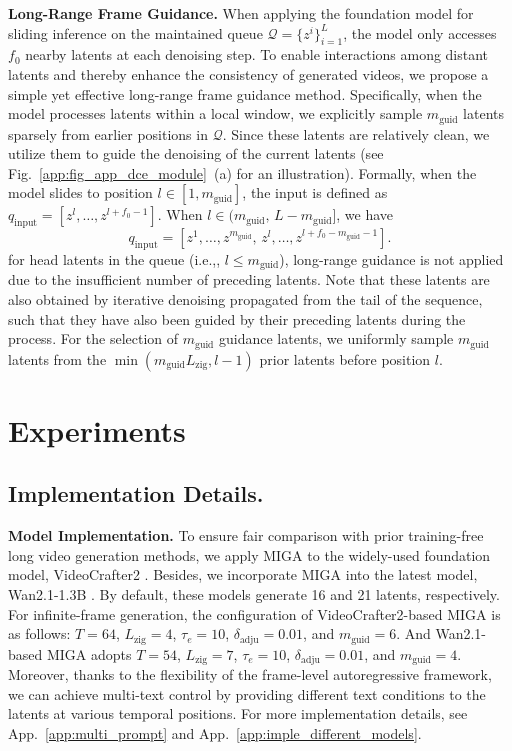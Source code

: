 \documentclass{llmxive}
\providecommand{\ie}{i.e.,\xspace}
\begin{document}
\textbf{Long-Range Frame Guidance.}
When applying the foundation model for sliding inference on the maintained queue $\mathcal{Q} = \{z^{i}\}_{i=1}^{L}$, the model only accesses $f_0$ nearby latents at each denoising step.
To enable interactions among distant latents \cite{feng2024memvlt} and thereby enhance the consistency of generated videos, we propose a simple yet effective long-range frame guidance method. 
Specifically, when the model processes latents within a local window, we explicitly sample $m_\mathrm{guid}$ latents sparsely from earlier positions in $\mathcal{Q}$.
Since these latents are relatively clean, we utilize them to guide the denoising of the current latents (see Fig.~\ref{app:fig_app_dce_module}~(a) for an illustration).
Formally, when the model slides to position $l \in [1, m_{\mathrm{guid}}]$, 
the input is defined as
$q_{\mathrm{input}} = [z^{l}, \ldots, z^{l+f_0-1}]$.
When $l \in (m_{\mathrm{guid}},\, L - m_{\mathrm{guid}}]$, we have
\begin{equation}
q_{\mathrm{input}} = [z^{1}, \ldots, z^{m_{\mathrm{guid}}},\, z^{l}, \ldots, z^{l+f_0-m_{\mathrm{guid}}-1}].
\end{equation}
for head latents in the queue (\ie, $l \leq m_\mathrm{guid}$), long-range guidance is not applied due to the insufficient number of preceding latents.
Note that these latents are also obtained by iterative denoising propagated from the tail of the sequence, such that they have also been guided by their preceding latents during the process. 
For the selection of $m_\mathrm{guid}$ guidance latents, we uniformly sample $m_\mathrm{guid}$ latents from the $\min(m_\mathrm{guid}L_{\mathrm{zig}}, l-1)$ prior latents before position $l$. 




\section{Experiments}
\subsection{Implementation Details.}
\label{exp:imp}


\textbf{Model Implementation.}
To ensure fair comparison with prior training-free long video generation methods, we apply MIGA to the widely-used foundation model, VideoCrafter2 \cite{chen2024videocrafter2}. Besides, we incorporate MIGA into the latest model, Wan2.1-1.3B \cite{wan2025wan}.
By default, these models generate 16 and 21 latents, respectively.
For infinite-frame generation, the configuration of VideoCrafter2-based MIGA is as follows: $T=64$, $L_{\mathrm{zig}}=4$, $\tau_{e}=10$, $\delta_{\mathrm{adju}}=0.01$, and $m_{\mathrm{guid}}=6$. And Wan2.1-based MIGA adopts $T=54$, $L_{\mathrm{zig}}=7$, $\tau_e=10$, $\delta_{\mathrm{adju}}=0.01$, and $m_{\mathrm{guid}}=4$. 
Moreover, thanks to the flexibility of the frame-level autoregressive framework, we can achieve multi-text control by providing different text conditions to the latents at various temporal positions. 
For more implementation details, see App.~\ref{app:multi_prompt} and App.~\ref{app:imple_different_models}.
\end{document}

